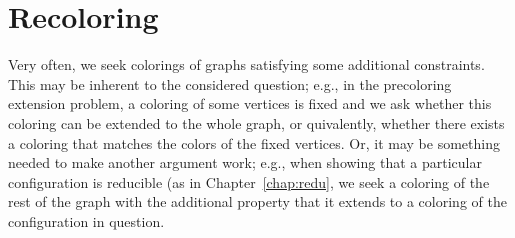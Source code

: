 \documentclass[12pt,twoside,openright,a4paper]{book}
\begin{document}
\chapter{Recoloring}\label{chap:recolor}

Very often, we seek colorings of graphs satisfying some additional constraints.
This may be inherent to the considered question; e.g., in the precoloring extension problem,
a coloring of some vertices is fixed and we ask whether this coloring can be extended to the
whole graph, or quivalently, whether there exists a coloring that matches the colors of the fixed
vertices.  Or, it may be something needed to make another argument work; e.g., when showing that
a particular configuration is reducible (as in Chapter~\ref{chap:redu}, we seek a coloring of the rest
of the graph with the additional property that it extends to a coloring of the configuration in question.
\end{document}
